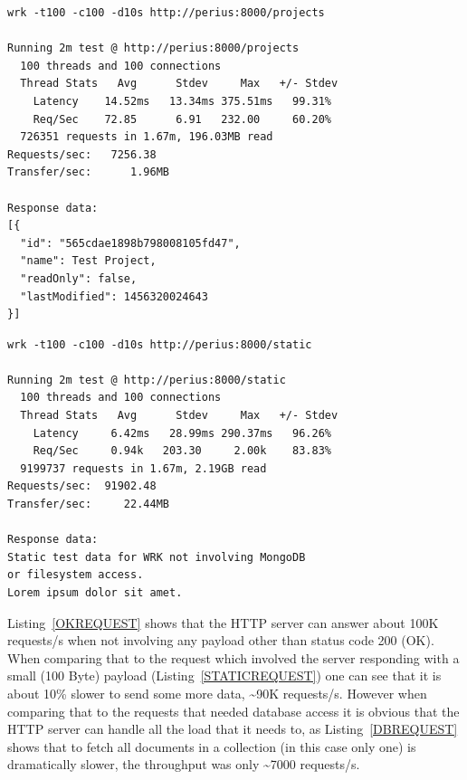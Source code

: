 \documentclass[a4paper,12pt]{article}
\newenvironment{custommargins}[2]%
  {\addtolength{\leftskip}{#1}\addtolength{\rightskip}{#2}}{\par}
\begin{document}
\begin{custommargins}{0cm}{-2cm}
\begin{minipage}{\linewidth-1cm}
\begin{lstlisting}[label=DBREQUEST,caption=Result of MongoDB requests]
wrk -t100 -c100 -d10s http://perius:8000/projects

Running 2m test @ http://perius:8000/projects
  100 threads and 100 connections
  Thread Stats   Avg      Stdev     Max   +/- Stdev
    Latency    14.52ms   13.34ms 375.51ms   99.31%
    Req/Sec    72.85      6.91   232.00     60.20%
  726351 requests in 1.67m, 196.03MB read
Requests/sec:   7256.38
Transfer/sec:      1.96MB

Response data:
[{
  "id": "565cdae1898b798008105fd47",
  "name": Test Project,
  "readOnly": false,
  "lastModified": 1456320024643
}]
\end{lstlisting}
\end{minipage}

\begin{minipage}{\linewidth-1cm}
\begin{lstlisting}[label=STATICREQUEST,caption=Result of static text requests]
wrk -t100 -c100 -d10s http://perius:8000/static

Running 2m test @ http://perius:8000/static
  100 threads and 100 connections
  Thread Stats   Avg      Stdev     Max   +/- Stdev
    Latency     6.42ms   28.99ms 290.37ms   96.26%
    Req/Sec     0.94k   203.30     2.00k    83.83%
  9199737 requests in 1.67m, 2.19GB read
Requests/sec:  91902.48
Transfer/sec:     22.44MB

Response data:
Static test data for WRK not involving MongoDB 
or filesystem access. 
Lorem ipsum dolor sit amet.
\end{lstlisting}
\end{minipage}
\end{custommargins}

Listing~\ref{OKREQUEST} shows that the HTTP server can answer about 100K requests/s when not
involving any payload other than status code 200 (OK). When comparing that to the request which
involved the server responding with a small (100 Byte) payload (Listing~\ref{STATICREQUEST}) one can
see that it is about 10\% slower to send some more data, \textasciitilde90K requests/s. However when
comparing that to the requests that needed database access it is obvious that the HTTP server can
handle all the load that it needs to, as Listing~\ref{DBREQUEST} shows that to fetch all documents
in a collection (in this case only one) is dramatically slower, the throughput was only
\textasciitilde7000 requests/s. 
\end{document}
